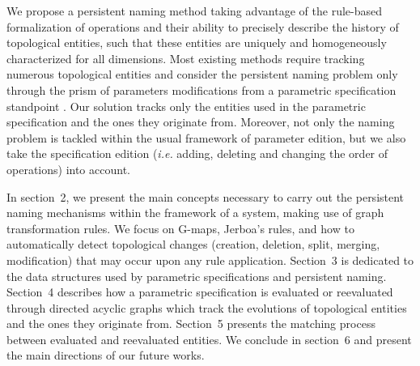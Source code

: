 We propose a persistent naming method taking advantage of the rule-based
formalization of operations and their ability to precisely describe the history
of topological entities, such that these entities are uniquely and
homogeneously characterized for all dimensions.  Most existing methods require 
tracking numerous topological entities and consider the persistent naming problem only
through the prism of parameters modifications from a parametric specification standpoint
\cite{KRIPAC1997, chen1995editability, wu2001face}. Our solution tracks
only the entities used in the parametric specification and the
ones they originate from. Moreover, not only the naming problem is tackled within the usual framework of  parameter edition, but we also take the specification edition (\textit{i.e.} adding, deleting and changing the order of operations) into account.

In section~2, we present the
main concepts necessary to carry out the persistent naming
mechanisms within the framework of a system, making use of
graph transformation rules. We 
focus on G-maps, Jerboa's rules, and how to
automatically detect topological
changes (creation, deletion, split, merging, modification) that
may occur upon any rule application. Section~3 is dedicated to the data structures
used by parametric specifications and persistent naming. Section~4 describes how 
a parametric specification is evaluated or reevaluated through directed acyclic graphs which track the evolutions of topological entities and the %
ones
they originate from. Section~5 presents the matching process between evaluated and reevaluated entities. We conclude in section~6 and present the main directions of our future works.


